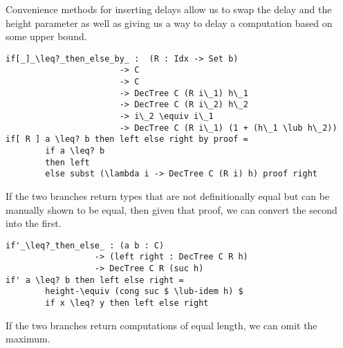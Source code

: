 Convenience methods for inserting delays allow us to swap the delay and the height parameter as well as giving us a way to delay a computation based on some upper bound.

\begin{lstlisting}[caption={Alternatives to if-then-else},label={lst:dectree:ifthenelse-alt},emph={if,then,else,by,DecTree,\_then\_else\_by\_,\[\_\]\_}]
if[_]_\leq?_then_else_by_ :  (R : Idx -> Set b)
                       -> C
                       -> C
                       -> DecTree C (R i\_1) h\_1
                       -> DecTree C (R i\_2) h\_2
                       -> i\_2 \equiv i\_1
                       -> DecTree C (R i\_1) (1 + (h\_1 \lub h\_2))
if[ R ] a \leq? b then left else right by proof =
        if a \leq? b
        then left
        else subst (\lambda i -> DecTree C (R i) h) proof right
\end{lstlisting}

If the two branches return types that are not definitionally equal but can be manually shown to be equal, then given that proof, we can convert the second into the first.

\begin{lstlisting}[caption={Alternatives to if-then-else},label={lst:dectree:ifthenelse-alt:2},emph={if'\_,\_then\_else\_,if,then,else,DecTree}]
if'_\leq?_then_else_ : (a b : C)
                  -> (left right : DecTree C R h)
                  -> DecTree C R (suc h)
if' a \leq? b then left else right =
        height-\equiv (cong suc $ \lub-idem h) $
        if x \leq? y then left else right
\end{lstlisting}

If the two branches return computations of equal length, we can omit the maximum.
